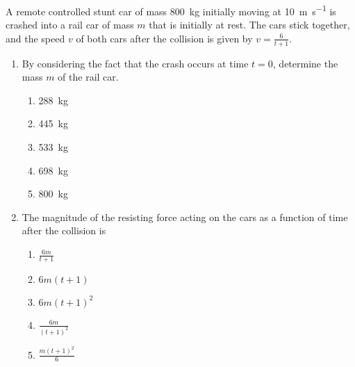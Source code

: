 \documentclass{../../oss-apphys}
\begin{document}
\begin{multicols}{2}
  A remote controlled stunt car of mass \SI{800}{\kilo\gram} initially moving at
  \SI{10}{\metre\per\second} is crashed into a rail car of mass $m$ that is
  initially at rest. The cars stick together, and the speed $v$ of both cars
  after the collision is given by $\displaystyle v=\frac{6}{t+1}$.
  \begin{enumerate}[resume,leftmargin=18pt]
  \item By considering the fact that the crash occurs at time $t=0$, determine
    the mass $m$ of the rail car.
    \begin{enumerate}[noitemsep,topsep=0pt,leftmargin=18pt,label=(\Alph*)]
    \item\SI{288}{\kilo\gram}
    \item\SI{445}{\kilo\gram}
    \item\SI{533}{\kilo\gram}
    \item\SI{698}{\kilo\gram}
    \item\SI{800}{\kilo\gram}
    \end{enumerate}
    
  \item The magnitude of the resisting force acting on the cars as a function of
    time after the collision is
    \begin{enumerate}[noitemsep,topsep=0pt,leftmargin=18pt,label=(\Alph*)]
    \item $\displaystyle \frac{6m}{t+1}$
    \item $6m(t+1)$
    \item $6m(t+1)^2$
    \item $\displaystyle\frac{6m}{(t+1)^2}$
    \item $\displaystyle\frac{m(t+1)^2}{6}$
    \end{enumerate}
    

\end{enumerate}
\end{multicols}
\end{document}
